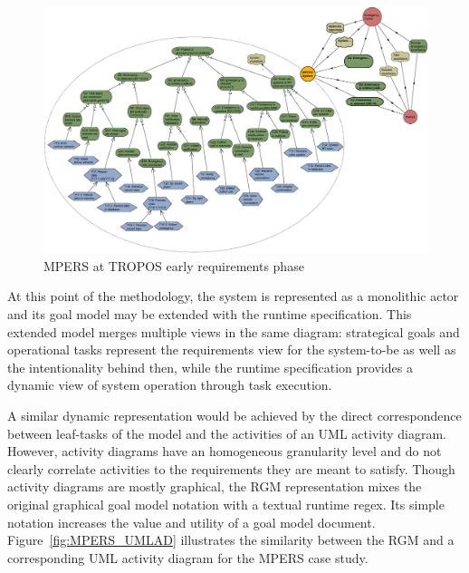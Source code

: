 \begin{figure}[h!]
\centering
\includegraphics[width=1\textwidth]{imgs/MPERS_LR.png}
\caption{MPERS at TROPOS early requirements phase}
\label{fig:MPERS_LR}
\end{figure}

At this point of the methodology, the system is represented as a monolithic actor and its goal model may be extended with the runtime specification. This extended model merges multiple views in the same diagram: strategical goals and operational tasks represent the requirements view for the system-to-be as well as the intentionality behind then, while the runtime specification provides a dynamic view of system operation through task execution.

A similar dynamic representation would be achieved by the direct correspondence between leaf-tasks of the model and the activities of an UML activity diagram. However, activity diagrams have an homogeneous granularity level and do not clearly correlate activities to the requirements they are meant to satisfy. Though activity diagrams are mostly graphical, the RGM representation mixes the original graphical goal model notation with a textual runtime regex. Its simple notation increases the value and utility of a goal model document. Figure~\ref{fig:MPERS_UMLAD} illustrates the similarity between the RGM and a corresponding UML activity diagram for the MPERS case study. 

